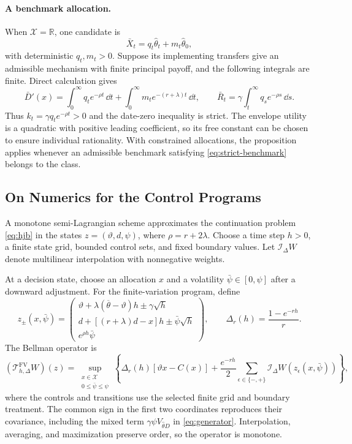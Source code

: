 \documentclass[12pt]{article}
\newcommand{\hth}{\hat\theta}
\begin{document}
\paragraph{A benchmark allocation.}
When \(\mathcal X=\mathbb R\), one candidate is
\[
  \bar X_t=q_t\hth_t+m_t\hth_0,
\]
with deterministic \(q_t,m_t>0\). Suppose its implementing
transfers give an admissible mechanism with finite principal payoff,
and the following integrals are finite. Direct calculation gives
\[
  \bar D'(x)
   =\int_0^\infty q_t e^{-\rho t}\,\dd t
     +\int_0^\infty m_t e^{-(r+\lambda)t}\,\dd t,
  \qquad
  \bar R_t=\gamma\int_t^\infty q_s e^{-\rho s}\,\dd s.
\]
Thus \(k_t=\gamma q_t e^{-\rho t}>0\) and the date-zero
inequality is strict. The envelope utility is a quadratic with
positive leading coefficient, so its free constant can be chosen to
ensure individual rationality. With constrained allocations, the
proposition applies whenever an admissible benchmark satisfying
\eqref{eq:strict-benchmark} belongs to the class.

\subsection{On Numerics for the Control Programs}
\label{app:numerics-control}

A monotone semi-Lagrangian scheme approximates the continuation problem
\eqref{eq:hjb} in the states \(z=(\vartheta,d,\psi)\), where
\(\rho=r+2\lambda\). Choose a time step \(h>0\), a finite state grid,
bounded control sets, and fixed boundary values. Let
\(\mathcal I_\Delta W\) denote multilinear interpolation with
nonnegative weights.

At a decision state, choose an allocation \(x\) and a volatility
\(\bar\psi\in[0,\psi]\) after a downward adjustment. For the
finite-variation program, define
\[
  z_\pm(x,\bar\psi)=
  \begin{pmatrix}
    \vartheta+\lambda(\overline\theta-\vartheta)h
                      \pm\gamma\sqrt h\\
    d+[(r+\lambda)d-x]h\pm\bar\psi\sqrt h\\
    e^{\rho h}\bar\psi
  \end{pmatrix},
  \qquad
  \Delta_r(h)=\frac{1-e^{-rh}}r .
\]
The Bellman operator is
\begin{equation}\label{eq:monotone-scheme}
  (\mathcal T_{h,\Delta}^{\mathrm{FV}}W)(z)
  =
  \sup_{\substack{x\in\mathcal X\\0\leq\bar\psi\leq\psi}}
  \left\{
    \Delta_r(h)[\vartheta x-C(x)]
    +\frac{e^{-rh}}2
      \sum_{\epsilon\in\{-,+\}}
        \mathcal I_\Delta W(z_\epsilon(x,\bar\psi))
  \right\},
\end{equation}
where the controls and transitions use the selected finite grid and
boundary treatment. The common sign in the first two coordinates
reproduces their covariance, including the mixed term
\(\gamma\psi V_{\hth D}\) in \eqref{eq:generator}.
Interpolation, averaging, and maximization preserve order, so the
operator is monotone.
\end{document}
